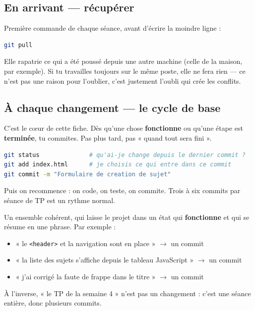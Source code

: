 \documentclass[a4paper,11pt]{article}
\begin{document}
\subsection{En arrivant --- récupérer}

Première commande de chaque séance, avant d'écrire la moindre ligne :

\begin{lstlisting}[language=bash]
git pull
\end{lstlisting}

Elle rapatrie ce qui a été poussé depuis une autre machine (celle de la maison, par exemple). Si tu travailles toujours sur le même poste, elle ne fera rien --- ce n'est pas une raison pour l'oublier, c'est justement l'oubli qui crée les conflits.

\subsection{À chaque changement --- le cycle de base}

C'est le cœur de cette fiche. Dès qu'une chose \textbf{fonctionne} ou qu'une étape est \textbf{terminée}, tu commites. Pas plus tard, pas « quand tout sera fini ».

\begin{lstlisting}[language=bash]
git status              # qu'ai-je change depuis le dernier commit ?
git add index.html      # je choisis ce qui entre dans ce commit
git commit -m "Formulaire de creation de sujet"
\end{lstlisting}

Puis on recommence : on code, on teste, on commite. Trois à six commits par séance de TP est un rythme normal.

\begin{tcolorbox}[definition, title={Qu'est-ce qu'un « changement » qui mérite un commit ?}]
Un ensemble cohérent, qui laisse le projet dans un état qui \textbf{fonctionne} et qui se résume en une phrase. Par exemple :
\begin{itemize}
  \item « le \texttt{<header>} et la navigation sont en place » $\rightarrow$ un commit
  \item « la liste des sujets s'affiche depuis le tableau JavaScript » $\rightarrow$ un commit
  \item « j'ai corrigé la faute de frappe dans le titre » $\rightarrow$ un commit
\end{itemize}
À l'inverse, « le TP de la semaine 4 » n'est pas un changement : c'est une séance entière, donc plusieurs commits.
\end{tcolorbox}
\end{document}
